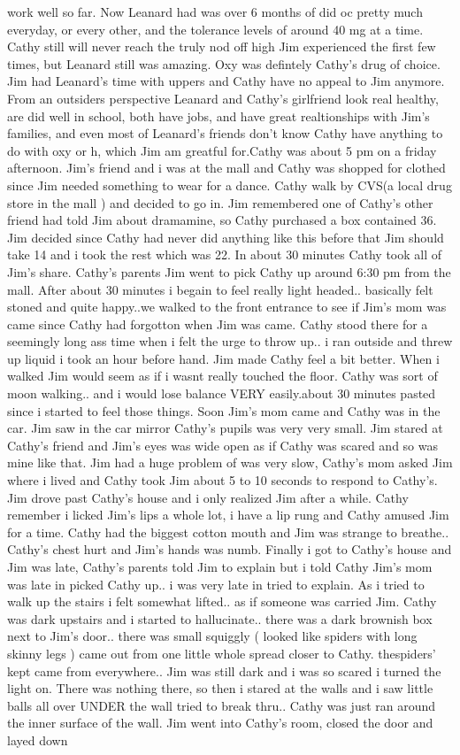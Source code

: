 \documentclass[12pt]{book}
\begin{document}
work well so far. Now Leanard had was over 6 months of did oc pretty much everyday, or every other, and the tolerance levels of around 40 mg at a time. Cathy still will never reach the truly nod off high Jim experienced the first few times, but Leanard still was amazing. Oxy was defintely Cathy's drug of choice. Jim had Leanard's time with uppers and Cathy have no appeal to Jim anymore. From an outsiders perspective Leanard and Cathy's girlfriend look real healthy, are did well in school, both have jobs, and have great realtionships with Jim's families, and even most of Leanard's friends don't know Cathy have anything to do with oxy or h, which Jim am greatful for.Cathy was about 5 pm on a friday afternoon. Jim's friend and i was at the mall and Cathy was shopped for clothed since Jim needed something to wear for a dance. Cathy walk by CVS(a local drug store in the mall ) and decided to go in. Jim remembered one of Cathy's other friend had told Jim about dramamine, so Cathy purchased a box contained 36. Jim decided since Cathy had never did anything like this before that Jim should take 14 and i took the rest which was 22. In about 30 minutes Cathy took all of Jim's share. Cathy's parents Jim went to pick Cathy up around 6:30 pm from the mall. After about 30 minutes i begain to feel really light headed.. basically felt stoned and quite happy..we walked to the front entrance to see if Jim's mom was came since Cathy had forgotton when Jim was came. Cathy stood there for a seemingly long ass time when i felt the urge to throw up.. i ran outside and threw up liquid i took an hour before hand. Jim made Cathy feel a bit better. When i walked Jim would seem as if i wasnt really touched the floor. Cathy was sort of moon walking.. and i would lose balance VERY easily.about 30 minutes pasted since i started to feel those things. Soon Jim's mom came and Cathy was in the car. Jim saw in the car mirror Cathy's pupils was very very small. Jim stared at Cathy's friend and Jim's eyes was wide open as if Cathy was scared and so was mine like that. Jim had a huge problem of was very slow, Cathy's mom asked Jim where i lived and Cathy took Jim about 5 to 10 seconds to respond to Cathy's. Jim drove past Cathy's house and i only realized Jim after a while. Cathy remember i licked Jim's lips a whole lot, i have a lip rung and Cathy amused Jim for a time. Cathy had the biggest cotton mouth and Jim was strange to breathe.. Cathy's chest hurt and Jim's hands was numb. Finally i got to Cathy's house and Jim was late, Cathy's parents told Jim to explain but i told Cathy Jim's mom was late in picked Cathy up.. i was very late in tried to explain. As i tried to walk up the stairs i felt somewhat lifted.. as if someone was carried Jim. Cathy was dark upstairs and i started to hallucinate.. there was a dark brownish box next to Jim's door.. there was small squiggly ( looked like spiders with long skinny legs ) came out from one little whole spread closer to Cathy. thespiders' kept came from everywhere.. Jim was still dark and i was so scared i turned the light on. There was nothing there, so then i stared at the walls and i saw little balls all over UNDER the wall tried to break thru.. Cathy was just ran around the inner surface of the wall. Jim went into Cathy's room, closed the door and layed down 
\end{document}
